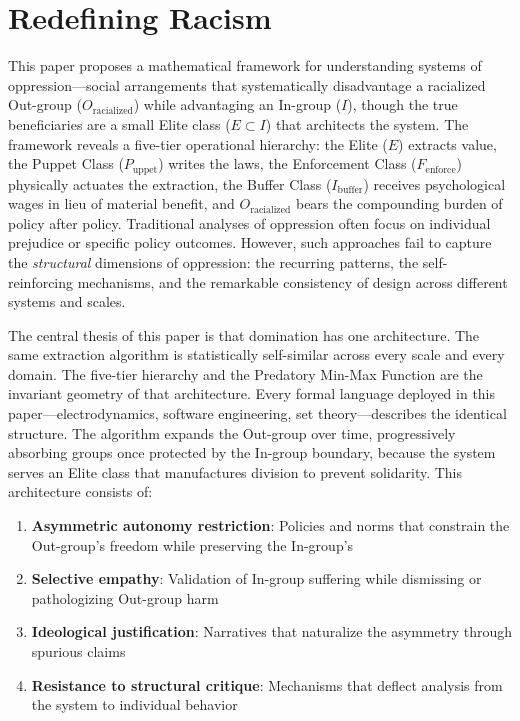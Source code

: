 \documentclass[12pt,openany]{book}
\begin{document}
\chapter{Redefining Racism}

This paper proposes a mathematical framework for understanding systems of oppression---social arrangements that systematically disadvantage a racialized Out-group ($O_{\text{racialized}}$) while advantaging an In-group ($I$), though the true beneficiaries are a small Elite class ($E \subset I$) that architects the system. The framework reveals a five-tier operational hierarchy: the Elite ($E$) extracts value, the Puppet Class ($P_{\text{uppet}}$) writes the laws, the Enforcement Class ($F_{\text{enforce}}$) physically actuates the extraction, the Buffer Class ($I_{\text{buffer}}$) receives psychological wages in lieu of material benefit, and $O_{\text{racialized}}$ bears the compounding burden of policy after policy. Traditional analyses of oppression often focus on individual prejudice or specific policy outcomes. However, such approaches fail to capture the \textit{structural} dimensions of oppression: the recurring patterns, the self-reinforcing mechanisms, and the remarkable consistency of design across different systems and scales.

The central thesis of this paper is that domination has one architecture. The same extraction algorithm is statistically self-similar across every scale and every domain. The five-tier hierarchy and the Predatory Min-Max Function are the invariant geometry of that architecture. Every formal language deployed in this paper---electrodynamics, software engineering, set theory---describes the identical structure. The algorithm expands the Out-group over time, progressively absorbing groups once protected by the In-group boundary, because the system serves an Elite class that manufactures division to prevent solidarity. This architecture consists of:
\begin{enumerate}
    \item \textbf{Asymmetric autonomy restriction}: Policies and norms that constrain the Out-group's freedom while preserving the In-group's
    \item \textbf{Selective empathy}: Validation of In-group suffering while dismissing or pathologizing Out-group harm
    \item \textbf{Ideological justification}: Narratives that naturalize the asymmetry through spurious claims
    \item \textbf{Resistance to structural critique}: Mechanisms that deflect analysis from the system to individual behavior
\end{enumerate}
\end{document}
